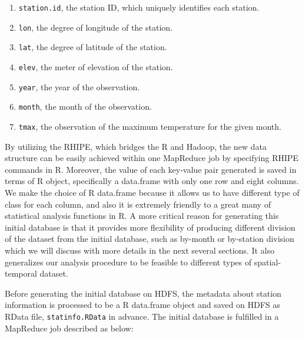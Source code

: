 \begin{enumerate}
  \item \texttt{station.id}, the station ID, which uniquely identifies each 
  station.
  \item \texttt{lon}, the degree of longitude of the station.
  \item \texttt{lat}, the degree of latitude of the station.
  \item \texttt{elev}, the meter of elevation of the station.
  \item \texttt{year}, the year of the observation.
  \item \texttt{month}, the month of the observation.
  \item \texttt{tmax}, the observation of the maximum temperature for the given 
  month.
\end{enumerate}

By utilizing the RHIPE, which bridges the R and Hadoop, the new data structure 
can be easily achieved within one MapReduce job by specifying RHIPE commands in 
R. Moreover, the value of each key-value pair generated is saved in terms of R 
object, specifically a data.frame with only one row and eight columns.
We make the choice of R data.frame because it allows us to have different type of
class for each column, and also it is extremely friendly to a great many of
statistical analysis functions in R. A more critical reason for generating this
initial database is that it provides more flexibility of producing different
division of the dataset from the initial database, such as by-month or by-station
division which we will discuss with more details in the next several sections. 
It also generalizes our analysis procedure to be feasible to different types of
spatial-temporal dataset. 

Before generating the initial database on HDFS, the metadata about station 
information is processed to be a R data.frame object and saved on HDFS as 
RData file, \texttt{statinfo.RData} in advance.
The initial database is fulfilled in a MapReduce job described as below:

